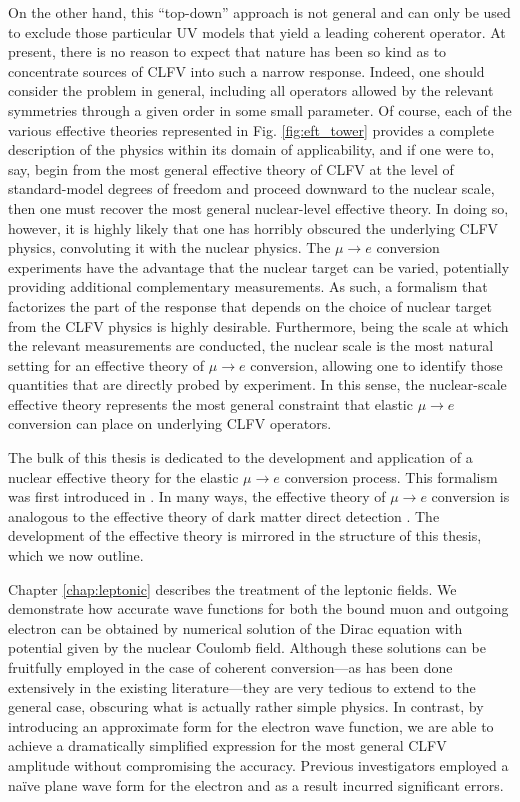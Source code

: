 \documentclass{book}[letterpaper,12pt]
\begin{document}
On the other hand, this ``top-down'' approach is not general and can only be used to exclude those particular UV models that yield a leading coherent operator. At present, there is no reason to expect that nature has been so kind as to concentrate sources of CLFV into such a narrow response. Indeed, one should consider the problem in general, including all operators allowed by the relevant symmetries through a given order in some small parameter. Of course, each of the various effective theories represented in Fig. \ref{fig:eft_tower} provides a complete description of the physics within its domain of applicability, and if one were to, say, begin from the most general effective theory of CLFV at the level of standard-model degrees of freedom and proceed downward to the nuclear scale, then one must recover the most general nuclear-level effective theory. In doing so, however, it is highly likely that one has horribly obscured the underlying CLFV physics, convoluting it with the nuclear physics. The $\mu\rightarrow e$ conversion experiments have the advantage that the nuclear target can be varied, potentially providing additional complementary measurements. As such, a formalism that factorizes the part of the response that depends on the choice of nuclear target from the CLFV physics is highly desirable. Furthermore, being the scale at which the relevant measurements are conducted, the nuclear scale is the most natural setting for an effective theory of $\mu\rightarrow e$ conversion, allowing one to identify those quantities that are directly probed by experiment. In this sense, the nuclear-scale effective theory represents the most general constraint that elastic $\mu\rightarrow e$ conversion can place on underlying CLFV operators.

The bulk of this thesis is dedicated to the development and application of a nuclear effective theory for the elastic $\mu\rightarrow e$ conversion process. This formalism was first introduced in \cite{rule2021nucleonlevel,haxton_2022}. In many ways, the effective theory of $\mu\rightarrow e$ conversion is analogous to the effective theory of dark matter direct detection \cite{Fitzpatrick_2013,Anand:2014kea}. The development of the effective theory is mirrored in the structure of this thesis, which we now outline.

Chapter \ref{chap:leptonic} describes the treatment of the leptonic fields. We demonstrate how accurate wave functions for both the bound muon and outgoing electron can be obtained by numerical solution of the Dirac equation with potential given by the nuclear Coulomb field. Although these solutions can be fruitfully employed in the case of coherent conversion---as has been done extensively in the existing literature---they are very tedious to extend to the general case, obscuring what is actually rather simple physics. In contrast, by introducing an approximate form for the electron wave function, we are able to achieve a dramatically simplified expression for the most general CLFV amplitude without compromising the accuracy. Previous investigators employed a na\"ive plane wave form for the electron and as a result incurred significant errors.
\end{document}
